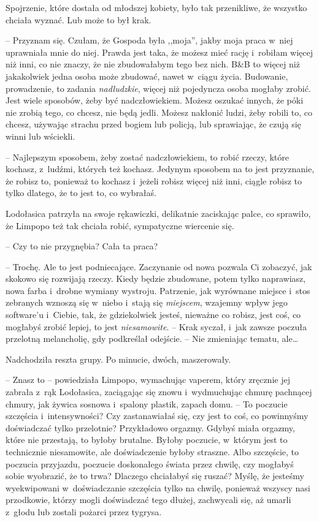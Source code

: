 \documentclass[oneside,polish,11pt,sfheadings]{mwbk}
\begin{document}
Spojrzenie, które dostała od młodszej kobiety, było tak przenikliwe, że
wszystko chciała wyznać. Lub może to był krak. 

-- Przyznam się. Czułam, że Gospoda była ,,moja'', jakby moja praca w~niej uprawniała mnie do
niej. Prawda jest taka, że możesz mieć rację i~robiłam więcej niż inni,
co nie znaczy, że nie zbudowałabym tego bez nich. B\&B to więcej niż
jakakolwiek jedna osoba może zbudować, nawet w~ciągu życia. Budowanie,
prowadzenie, to zadania \textit{nadludzkie}, więcej niż pojedyncza osoba
mogłaby zrobić. Jest wiele sposobów, żeby być nadczłowiekiem. Możesz
oszukać innych, że póki nie zrobią tego, co chcesz, nie będą jedli.
Możesz nakłonić ludzi, żeby robili to, co chcesz, używając strachu przed
bogiem lub policją, lub sprawiając, że czują się winni lub wściekli.

-- Najlepszym sposobem, żeby zostać nadczłowiekiem, to robić rzeczy,
które kochasz, z~ludźmi, których też kochasz. Jedynym sposobem na to
jest przyznanie, że robisz to, ponieważ to kochasz i~jeżeli robisz
więcej niż inni, ciągle robisz to tylko dlatego, że to jest to, co
wybrałaś.

Lodołasica patrzyła na swoje rękawiczki, delikatnie zaciskając palce, co
sprawiło, że Limpopo też tak chciała robić, sympatyczne wiercenie się. 

-- Czy to nie przygnębia? Cała ta praca?

-- Trochę. Ale to jest podniecające. Zaczynanie od nowa pozwala Ci
zobaczyć, jak skokowo się rozwijają rzeczy. Kiedy będzie zbudowane,
potem tylko naprawiasz, nowa farba i~drobne wymiany wystroju. Patrzenie,
jak wyrównane miejsce i~stos zebranych wznoszą się w~niebo i~stają się
\textit{miejscem}, wzajemny wpływ jego software'u i~Ciebie, tak, że
gdziekolwiek jesteś, nieważne co robisz, jest coś, co mogłabyś zrobić
lepiej, to jest \textit{niesamowite}. -- Krak syczał, i~jak zawsze poczuła
przelotną melancholię, gdy podkreślał odejście. -- Nie zmieniając tematu,
ale\ldots 

Nadchodziła reszta grupy. Po minucie, dwóch, maszerowały.

-- Znasz to -- powiedziała Limpopo, wymachując vaperem, który zręcznie jej
zabrała z~rąk Lodołasica, zaciągając się znowu i~wydmuchując chmurę
pachnącej chmury, jak żywica sosnowa i~spalony plastik, zapach domu. -- To poczucie szczęścia i~intensywności? Czy zastanawiałaś się, czy jest
to coś, co powinnyśmy doświadczać tylko przelotnie? Przykładowo orgazmy.
Gdybyś miała orgazmy, które nie przestają, to byłoby brutalne. Byłoby
poczucie, w~którym jest to technicznie niesamowite, ale doświadczenie
byłoby straszne. Albo szczęście, to poczucia przyjazdu, poczucie
doskonałego świata przez chwilę, czy mogłabyś sobie wyobrazić, że to
trwa? Dlaczego chciałabyś się ruszać? Myślę, że jesteśmy wyekwipowani w~doświadczanie szczęścia tylko na chwilę, ponieważ wszyscy nasi
przodkowie, którzy mogli doświadczać tego dłużej, zachwycali się, aż
umarli z~głodu lub zostali pożarci przez tygrysa.
\end{document}
